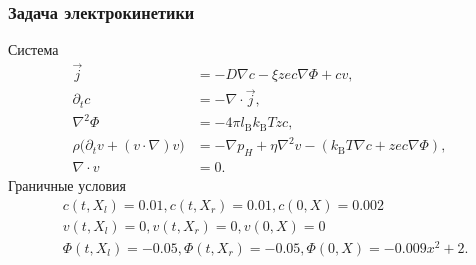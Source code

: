 \documentclass[t]{beamer}
\begin{document}
    \begin{frame}
        \frametitle{Задача электрокинетики}
        Система
        \begin{equation*}\label{eq:ek_eq}
            \begin{aligned}
                \vec{j}                                             & =
                -D \nabla c - \xi z e c \nabla \Phi + c v,                                    \\
                \partial_{t} c                                      & =
                -\nabla \cdot\vec{j},                                                         \\
                \nabla^2 \Phi                                       & =
                -4 \pi l_\mathrm{B} k_\mathrm{B}T z c,                                        \\
                \rho \big( \partial_t v + (v \cdot \nabla ) v \big) & =
                -\nabla p_H + \eta \nabla^{2} v - (k_\mathrm{B}T \nabla c + zec \nabla \Phi), \\
                \nabla \cdot v                                      & =
                0.
            \end{aligned}
        \end{equation*}
        Граничные условия
        \begin{equation*}\label{eq:ek_bnd}
            \begin{aligned}
                &c(t, X_l)    = 0.01, c(t, X_r)    = 0.01, c(0, X)      = 0.002        \\
                &v(t, X_l)    = 0, v(t, X_r)    = 0, v(0, X)      = 0            \\
                &\Phi(t, X_l) = -0.05, \Phi(t, X_r) = -0.05, \Phi(0, X)   = -0.009x^2+2.
            \end{aligned}
        \end{equation*}
    \end{frame}
\end{document}
